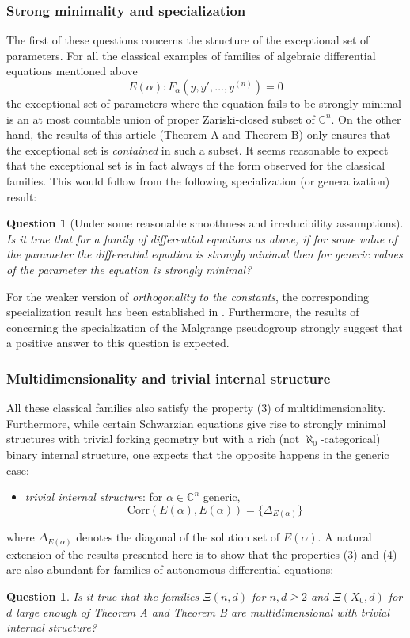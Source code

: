 \documentclass[12pt]{amsart}
\theoremstyle{definition}
\theoremstyle{plain}
\newtheorem{question}[definition]{Question}
\theoremstyle{exampstyle}
\theoremstyle{exampstyle}\newtheorem{thmxbis}{Theorem}
\numberwithin{equation}{section}
\theoremstyle{remark}
\begin{document}
\subsubsection*{Strong minimality and specialization} The first of these questions concerns the structure of the exceptional set of parameters. For all the classical examples of families of algebraic differential equations mentioned above 
$$ E(\alpha): F_\alpha(y,y',\ldots, y^{(n)}) = 0$$
the exceptional set of parameters where the equation fails to be strongly minimal is an at most countable union of proper Zariski-closed subset of $\mathbb{C}^n$. On the other hand, the results of this article (Theorem A and Theorem B) only ensures that the exceptional set is {\em contained} in such a subset. It seems reasonable to expect that the exceptional set is in fact always of the form observed for the classical families. This would follow from the following specialization (or generalization) result: 
\begin{question}[Under some reasonable smoothness and irreducibility assumptions]
Is it true that for a family of differential equations as above, if for some value of the parameter the differential equation is strongly minimal then for generic values of the parameter the equation is strongly minimal? 
\end{question} 

For the weaker version of {\em orthogonality to the constants}, the corresponding specialization result has been established in \cite{jaoui-Bulletin}. Furthermore, the results of \cite{Casale-Davy} concerning the specialization of the Malgrange pseudogroup strongly suggest that a positive answer to this question is expected.

\subsubsection*{Multidimensionality and trivial internal structure} All these classical families also satisfy the property (3) of multidimensionality. Furthermore, while certain Schwarzian equations give rise to strongly minimal structures with trivial forking geometry but with a rich (not $\aleph_0$-categorical) binary internal structure, one expects that the opposite happens in the generic case: 
\begin{itemize}
\item[(4)] \textit{trivial internal structure}: for $\alpha \in \mathbb{C}^n$ generic, 
$$\mathrm{Corr}(E(\alpha), E(\alpha)) = \lbrace \Delta_{E(\alpha)} \rbrace$$ 
\end{itemize} 
where $\Delta_{E(\alpha)}$ denotes the diagonal of the solution set of $E(\alpha)$.
A natural extension of the results presented here is to show that the properties (3) and (4) are also abundant for families of autonomous differential equations:  
%
\begin{question}
Is it true that the families $\Xi (n,d)$ for $n,d \geq 2$ and $\Xi(X_0,d)$ for $d$ large enough of Theorem A and Theorem B are multidimensional with trivial internal structure? 
\end{question} 
%
%
\end{document}
